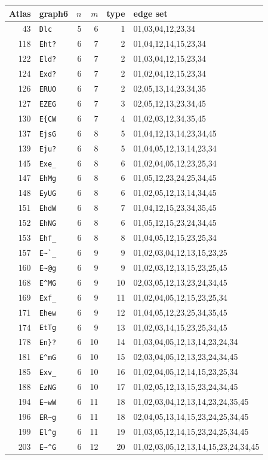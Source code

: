 \documentclass[11pt]{article}
\begin{document}
\scriptsize
\begin{longtable}{r@{\quad}lrrr@{\quad}p{8.2cm}}
Atlas&graph6&$n$&$m$&type&edge set\\ \hline
43&\verb|Dlc|&5&6&1&01,03,04,12,23,34\\
118&\verb|Eht?|&6&7&2&01,04,12,14,15,23,34\\
122&\verb|Eld?|&6&7&2&01,03,04,12,15,23,34\\
124&\verb|Exd?|&6&7&2&01,02,04,12,15,23,34\\
126&\verb|ERUO|&6&7&2&02,05,13,14,23,34,35\\
127&\verb|EZEG|&6&7&3&02,05,12,13,23,34,45\\
130&\verb|E{CW|&6&7&4&01,02,03,12,34,35,45\\
137&\verb|EjsG|&6&8&5&01,04,12,13,14,23,34,45\\
139&\verb|Eju?|&6&8&5&01,04,05,12,13,14,23,34\\
145&\verb|Exe_|&6&8&6&01,02,04,05,12,23,25,34\\
147&\verb|EhMg|&6&8&6&01,05,12,23,24,25,34,45\\
148&\verb|EyUG|&6&8&6&01,02,05,12,13,14,34,45\\
151&\verb|EhdW|&6&8&7&01,04,12,15,23,34,35,45\\
152&\verb|EhNG|&6&8&6&01,05,12,15,23,24,34,45\\
153&\verb|Ehf_|&6&8&8&01,04,05,12,15,23,25,34\\
157&\verb|E~`_|&6&9&9&01,02,03,04,12,13,15,23,25\\
160&\verb|E~@g|&6&9&9&01,02,03,12,13,15,23,25,45\\
168&\verb|E^MG|&6&9&10&02,03,05,12,13,23,24,34,45\\
169&\verb|Exf_|&6&9&11&01,02,04,05,12,15,23,25,34\\
171&\verb|Ehew|&6&9&12&01,04,05,12,23,25,34,35,45\\
174&\verb|EtTg|&6&9&13&01,02,03,14,15,23,25,34,45\\
178&\verb|En}?|&6&10&14&01,03,04,05,12,13,14,23,24,34\\
181&\verb|E^mG|&6&10&15&02,03,04,05,12,13,23,24,34,45\\
185&\verb|Exv_|&6&10&16&01,02,04,05,12,14,15,23,25,34\\
188&\verb|EzNG|&6&10&17&01,02,05,12,13,15,23,24,34,45\\
194&\verb|E~wW|&6&11&18&01,02,03,04,12,13,14,23,24,35,45\\
196&\verb|ER~g|&6&11&18&02,04,05,13,14,15,23,24,25,34,45\\
199&\verb|El^g|&6&11&19&01,03,05,12,14,15,23,24,25,34,45\\
203&\verb|E~^G|&6&12&20&01,02,03,05,12,13,14,15,23,24,34,45
\end{longtable}
\normalsize
\end{document}
